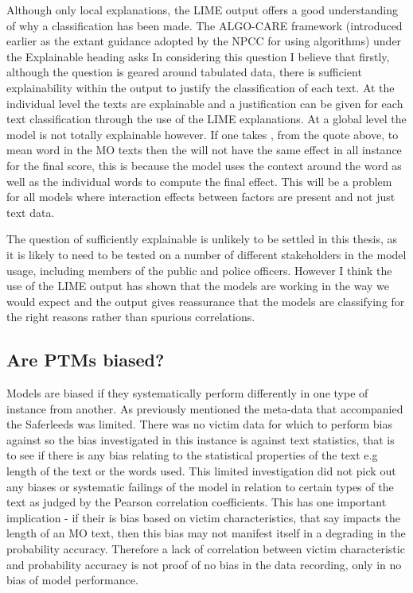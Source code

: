 Although only local explanations, the LIME output offers a good understanding of why a classification has been made. The ALGO-CARE framework (introduced earlier as the extant guidance adopted by the NPCC for using algorithms) under the Explainable heading asks  In considering this question I believe that firstly, although the question is geared around tabulated data, there is sufficient explainability within the output to justify the classification of each text. At the individual level the texts are explainable and a justification can be given for each text classification through the use of the LIME explanations. At a global level the model is not totally explainable however. If one takes , from the quote above, to mean word in the MO texts then the  will not have the same effect in all instance for the final score, this is because the model uses the context around the word as well as the individual words to compute the final effect. This will be a problem for all models where interaction effects between factors are present and not just text data.

The question of sufficiently explainable is unlikely to be settled in this thesis, as it is likely to need to be tested on a number of different stakeholders in the model usage, including members of the public and police officers. However I think the use of the LIME output has shown that the models are working in the way we would expect and the output gives reassurance that the models are classifying for the right reasons rather than spurious correlations. 


\subsection{Are PTMs biased?} Models are biased if they systematically perform differently in one type of instance from another. As previously mentioned the meta-data that accompanied the Saferleeds was limited. There was no victim data for which to perform bias against so the bias investigated in this instance is against text statistics, that is to see if there is any bias relating to the statistical properties of the text e.g length of the text or the words used. This limited investigation did not pick out any biases or systematic failings of the model in relation to certain types of the text as judged by the Pearson correlation coefficients. This has one important implication - if their is bias based on victim characteristics, that say impacts the length of an MO text, then this bias may not manifest itself in a degrading in the probability accuracy. Therefore a lack of correlation between victim characteristic and probability accuracy is not proof of no bias in the data recording, only in no bias of model performance. 




